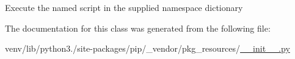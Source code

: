 \begin{DoxyVerb}Execute the named script in the supplied namespace dictionary\end{DoxyVerb}
 

The documentation for this class was generated from the following file\+:\begin{DoxyCompactItemize}
\item 
venv/lib/python3./site-\/packages/pip/\+\_\+vendor/pkg\+\_\+resources/\hyperlink{venv_2lib_2python3_89_2site-packages_2pip_2__vendor_2pkg__resources_2____init_____8py}{\+\_\+\+\_\+init\+\_\+\+\_\+.\+py}\end{DoxyCompactItemize}
